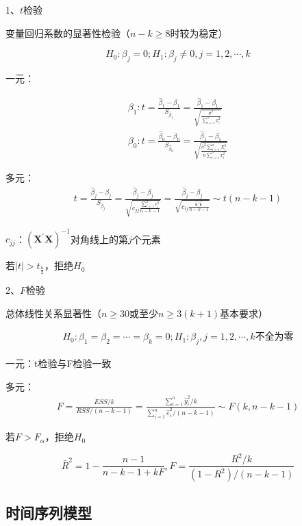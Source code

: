 \documentclass[12pt]{book}
\begin{document}
1、$t$检验

变量回归系数的显著性检验（$n-k\geq 8$时较为稳定）

$$
H_0:\beta_j=0; H_1:\beta_j\neq 0, j=1,2,\cdots,k
$$

一元：

\begin{gather*}
\beta_1:
t
=\frac{\hat{\beta}_1-\beta_1}{S_{\hat{\beta}_1}} 
=\frac{\hat{\beta}_1-\beta_1}{\sqrt{\frac{\hat{\sigma}^2}{\sum_{i=1}^{n}{x_i^2}}}}\\
\beta_0: 
t
=\frac{\hat{\beta}_0-\beta_0}{S_{\hat{\beta}_0}} 
=\frac{\hat{\beta}_1-\beta_1}{\sqrt{\frac{\hat{\sigma}^2\sum_{i=1}^{n}{X_i^2}}{n \sum_{i=1}^{n}{x_i^2}}}}
\end{gather*}


多元：
\begin{gather*}
    t=\frac{\hat{\beta}_j-\beta_j}{S_{\hat{\beta}_j}} =\frac{\hat{\beta}_j-\beta_j}{\sqrt{c_{jj}\frac{\sum_{i=1}^{n}{\varepsilon_i^2}}{n -k-1}}} =\frac{\hat{\beta}_j-\beta_j}{\sqrt{c_{ij}\frac{\bm{\hat{\varepsilon}}' \bm{ \hat{\varepsilon}}}{n -k-1}}} \sim t(n-k-1)
\end{gather*}


$c_{jj}$：$\left(\bm{X}^\prime\bm{X}\right)^{-1}$对角线上的第$j$个元素

若$\left|t\right|>t_{\frac{a}{2}}$，拒绝$H_0$

2、$F$检验

总体线性关系显著性（$n\geq 30$或至少$n\geq3\left(k+1\right)$基本要求）

\begin{gather*}
    H_0:\beta_1=\beta_2=\cdots=\beta_k=0;H_1:\beta_{j}, j=1,2,\cdots,k\text{不全为零}
\end{gather*}


一元：t检验与F检验一致

多元：
\begin{gather*}
F=\frac{ESS/k}{RSS/(n-k-1)} = \frac{\sum_{i=1}^{n}{\hat{y}_i^2/k}}{\sum_{i=1}^{n}{\hat{\varepsilon}_i^2/(n-k-1)}}\sim F(k,n-k-1)
\end{gather*}


若$F>F_\alpha$，拒绝$H_0$

$$
{\bar{R}}^2=1-\frac{n-1}{n-k-1+kF}, F=\frac{R^2/k}{(1-R^2)/(n-k-1)}
$$












\subsection{时间序列模型}
\end{document}
